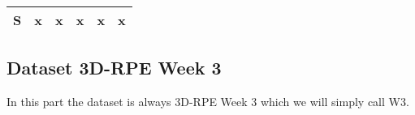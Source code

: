 \begin{table}[H]
\begin{tabular}{lccccc}
  S & x                                                                & x                                                               & x                                                     & x                                                               & x \\
  \bottomrule
\end{tabular}
\end{table}

\subsection{Dataset 3D-RPE Week 3}


In this part the dataset is always 3D-RPE Week 3 which we will simply call W3.

